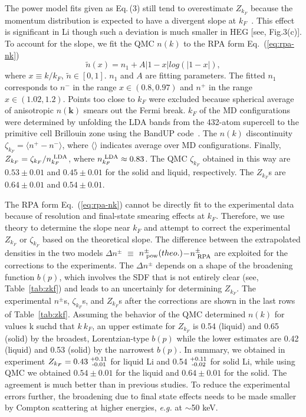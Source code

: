 \documentclass[twocolumn,showpacs,showkeys,fleqn,prl,superscriptaddress]{revtex4}%
\newcommand{\nn}[1]{\textnormal{ #1}}
\begin{document}
The power model fits given as Eq.\,(3) still tend to overestimate $Z_{k_F}$ because the momentum distribution is expected to have a divergent slope at $k_F$~\cite{gg02}.
This effect is significant in Li though such a deviation is much smaller in HEG [see, Fig.3(c)].
To account for the slope, we fit the QMC $n(k)$ to the RPA form Eq.~(\ref{eq:rpa-nk})
\begin{equation} \label{eq:rpa-nk}
\tilde{n}(x) = n_1 + A\vert 1-x\vert log\left(\vert 1-x\vert\right),
\end{equation}
where $x\equiv k/k_F$, $\tilde{n}\in[0,1]$. $n_1$ and $A$ are fitting parameters. The fitted $n_1$ corresponds to $n^-$ in the range $x\in(0.8, 0.97)$ and $n^+$ in the range $x\in(1.02, 1.2)$. Points too close to $k_F$ were excluded because spherical average of anisotropic $n(\boldsymbol{k})$ smears out the Fermi break. $k_F$ of the MD configurations were determined by unfolding the LDA bands from the 432-atom supercell to the primitive cell Brillouin zone using the BandUP code~\cite{Medeiros2014,Medeiros2015}. The $n(k)$ discontinuity $\zeta_{k_F}= \langle n^+-n^-\rangle$, where $\langle\rangle$ indicates average over MD configurations. Finally, $Z_{k_F} = \zeta_{k_F}/n_{k_F}^{\nn{LDA}}$, where $n_{k_F}^\nn{LDA}\approx0.83$. The QMC $\zeta_{k_F}$ obtained in this way are $0.53\pm0.01$ and $0.45\pm0.01$ for the solid and liquid, respectively. The $Z_{k_F}$s are $0.64\pm0.01$ and $0.54\pm0.01$.

The RPA form Eq.~(\ref{eq:rpa-nk}) cannot be directly fit to the experimental data because of resolution and final-state smearing effects at $k_F$.
Therefore, we use theory to determine the slope near $k_F$ and attempt to correct the experimental $Z_{k_F}$ or $\zeta_{k_F}$ based on the theoretical slope.
The difference between the extrapolated densities in the two models $\Delta n^{\pm}$ $\equiv$ $n^{\pm}_{\nn{pow}} (theo.)$$-$$n^{\pm}_{\nn{RPA}}$ are exploited for the corrections to the experiments.
The $\Delta n^{\pm}$ depends on a shape of the broadening function $b(p)$, which involves the SDF that is not entirely clear (see, Table~\ref{tab:zkf}) and leads to an uncertainly for determining $Z_{k_F}$.
The experimental $n^{\pm}$s, $\zeta_{k_F}$s, and $Z_{k_F}$s after the corrections are shown in the last rows of Table~\ref{tab:zkf}.
Assuming the behavior of the  QMC determined $n(k)$ for values k suchd that $k ~ k_F$, an upper estimate for $Z_{k_F}$ is  0.54 (liquid) and 0.65 (solid) by the broadest, Lorentzian-type $b(p)$ while the lower estimates are 0.42 (liquid) and 0.53 (solid) by the narrowest $b(p)$.
In summary, we obtained in experiment $Z_{k_F}=  0.43^{\nn{+0.11}}_{\nn{\;-0.01}}$ for liquid Li and 0.54$^{\nn{+0.11}}_{\nn{\;-0.02}}$ for solid Li, while using QMC we obtained $0.54\pm0.01$ for the liquid and $0.64\pm0.01$ for the solid.
The agreement is much better than in previous studies.
To reduce the experimental errors further, the broadening due to final state effects needs to be made smaller by Compton scattering at higher energies, {\it{e.g.}} at $\sim$50 keV.
\end{document}
